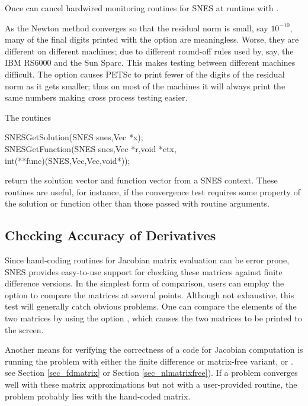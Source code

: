 Once can cancel hardwired monitoring routines for SNES at runtime with 
. 

As the Newton method converges so that the residual norm is small,
say $ 10^{-10} $, many of the final digits printed with the 
option are meaningless. Worse, they are different on different 
machines; due to different round-off rules used by, say, the IBM RS6000
and the Sun Sparc. This makes testing between different machines
difficult. The option  
causes PETSc to print fewer of the digits of the residual norm 
as it gets smaller; thus on most of the machines it will always
print the same numbers making cross process testing easier.

The routines  
\begin{tabbing}
  SNESGetSolution(SNES snes,Vec *x);\\
  SNESGetFunction(\=SNES snes,Vec *r,void *ctx,\\
                  \>        int(**func)(SNES,Vec,Vec,void*));
\end{tabbing}
return the solution vector and function vector from a SNES context. 
These routines are useful, for instance, if the convergence test requires 
some property of the solution or function other than those passed with
routine arguments.

\subsection{Checking Accuracy of Derivatives}
\label{sec_snesderivs}

Since hand-coding routines for Jacobian matrix evaluation
can be error prone, SNES provides easy-to-use support for checking
these matrices against finite difference versions.  In the simplest
form of comparison, users can employ the option  
to compare the matrices at several points.  Although not exhaustive,
this test will generally catch obvious problems.  One can compare the
elements of the two matrices by using the option  , which causes the two 
matrices to be printed to the screen.  

Another means for verifying the correctness of a code for Jacobian
computation is running the problem with either the finite
difference or matrix-free variant,  or .
see Section \ref{sec_fdmatrix} or Section \ref{sec_nlmatrixfree}). 
If a problem converges well
with these matrix approximations but not with a user-provided routine,
the problem probably lies with the hand-coded
matrix. 

